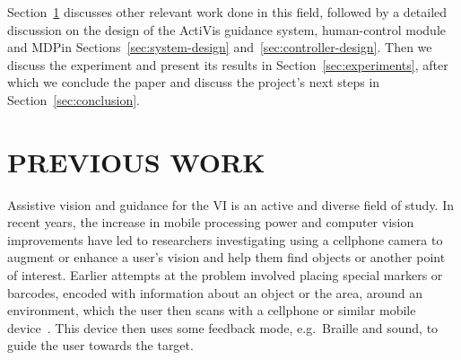 \documentclass[a4paper, twoside]{article}
\begin{document}

Section~\ref{sec:previous-work} discusses other relevant work done in this field, followed by a detailed discussion on the design of the ActiVis guidance system, human-control module and MDP\@ in Sections~\ref{sec:system-design} and~\ref{sec:controller-design}. Then we discuss the experiment and present its results in Section~\ref{sec:experiments}, after which we conclude the paper and discuss the project's next steps in Section~\ref{sec:conclusion}. 

\section{\uppercase{Previous Work}}\label{sec:previous-work}

\noindent Assistive vision and guidance for the VI is an active and diverse field of study. In recent years, the increase in mobile processing power and computer vision improvements have led to researchers investigating using a cellphone camera to augment or enhance a user's vision and help them find objects or another point of interest. Earlier attempts at the problem involved placing special markers or barcodes, encoded with information about an object or the area, around an environment, which the user then scans with a cellphone or similar mobile device~\cite{gude2013blind,iannizzotto2005badge3d,manduchi2012mobile}. This device then uses some feedback mode, e.g.\ Braille and sound, to guide the user towards the target. %
\end{document}
